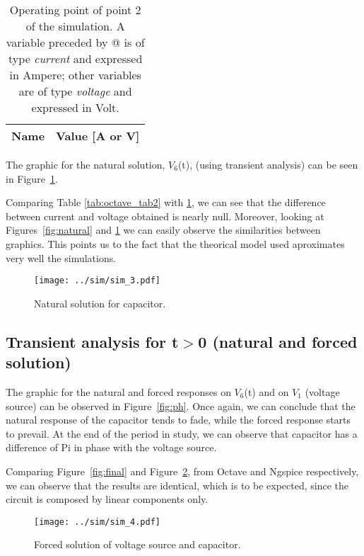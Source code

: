 \begin{table}[H]
  \centering
  \begin{tabular}{|l|r|}
    \hline    
    {\bf Name} & {\bf Value [A or V]} \\ \hline
    
  \end{tabular}
  \caption{Operating point of point 2 of the simulation. A variable preceded by @ is of type {\em current}
    and expressed in Ampere; other variables are of type {\it voltage} and expressed in
    Volt.}
  \label{tab:op2}
\end{table}


The graphic for the natural solution, $V_6$(t), (using transient analysis) can be seen in Figure~\ref{fig:nat_sol}.

Comparing Table \ref{tab:octave_tab2} with \ref{tab:op2}, we can see that the difference between current and voltage obtained is nearly null. Moreover, looking at Figures~\ref{fig:natural} and \ref{fig:nat_sol} we can easily observe the similarities between graphics. This points us to the fact that the theorical model used aproximates very well the simulations.

\begin{figure}[H] \centering
\texttt{[image: ../sim/sim\_3.pdf]}
\caption{Natural solution for capacitor.}
\label{fig:nat_sol}
\end{figure}
\newpage
\subsection{Transient analysis for t$>$0 (natural and forced solution)}

\tab The graphic for the natural and forced responses on $V_6$(t) and on $V_1$ (voltage source) can be observed in Figure~\ref{fig:ph}. Once again, we can conclude that the natural response of the capacitor tends to fade, while the forced response starts to prevail. At the end of the period in study, we can observe that capacitor has a difference of Pi in phase with the voltage source.

Comparing Figure~\ref{fig:final} and Figure~\ref{fig:nat_for}, from Octave and Ngspice respectively, we can observe that the results are identical, which is to be expected, since the circuit is composed by linear components only.

\begin{figure}[H] \centering
\texttt{[image: ../sim/sim\_4.pdf]}
\caption{Forced solution of voltage source and capacitor.}
\label{fig:nat_for}
\end{figure}
